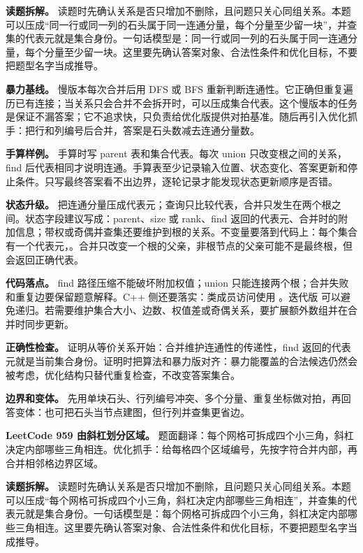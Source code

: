 \textbf{读题拆解。} 读题时先确认关系是否只增加不删除，且问题只关心同组关系。本题可以压成“同一行或同一列的石头属于同一连通分量，每个分量至少留一块”，并查集的代表元就是集合身份。一句话模型是：同一行或同一列的石头属于同一连通分量，每个分量至少留一块。这里要先确认答案对象、合法性条件和优化目标，不要把题型名字当成推导。

\textbf{暴力基线。} 慢版本每次合并后用 DFS 或 BFS 重新判断连通性。它正确但重复遍历已有连接；当关系只会合并不会拆开时，可以压成集合代表。这个慢版本的任务是保证不漏答案；它不追求快，只负责给优化版提供对拍基准。随后再引入优化抓手：把行和列编号后合并，答案是石头数减去连通分量数。

\textbf{手算样例。} 手算时写 parent 表和集合代表。每次 union 只改变根之间的关系，find 后代表相同才说明连通。手算表至少记录输入位置、状态变化、答案更新和停止条件。只写最终答案看不出边界，逐轮记录才能发现状态更新顺序是否错。

\textbf{状态升级。} 把连通分量压成代表元；查询只比较代表，合并只发生在两个根之间。状态字段建议写成：parent、size 或 rank、find 返回的代表元、合并时的附加信息；带权或奇偶并查集还要维护到根的关系。不变量要落到代码上：每个集合有一个代表元，。合并只改变一个根的父亲，非根节点的父亲可能不是最终根，但  会返回正确代表。

\textbf{代码落点。} find 路径压缩不能破坏附加权值；union 只能连接两个根；合并失败和重复边要保留题意解释。C++ 侧还要落实：类成员访问使用 。迭代版  可以避免递归。若需要维护集合大小、边数、权值差或奇偶关系，要扩展额外数组并在合并时同步更新。

\textbf{正确性检查。} 证明从等价关系开始：合并维护连通性的传递性，find 返回的代表元就是当前集合身份。证明时把算法和暴力版对齐：暴力能覆盖的合法候选仍然会被考虑，优化结构只替代重复检查，不改变答案集合。

\textbf{边界和变体。} 先用单块石头、行列编号冲突、多个分量、重复坐标做对拍，再回答变体：也可把石头当节点建图，但行列并查集更省边。

\noindent\textbf{LeetCode 959 由斜杠划分区域。} 题面翻译：每个网格可拆成四个小三角，斜杠决定内部哪些三角相连。优化抓手：给每格四个区域编号，先按字符合并内部，再合并相邻格边界区域。

\textbf{读题拆解。} 读题时先确认关系是否只增加不删除，且问题只关心同组关系。本题可以压成“每个网格可拆成四个小三角，斜杠决定内部哪些三角相连”，并查集的代表元就是集合身份。一句话模型是：每个网格可拆成四个小三角，斜杠决定内部哪些三角相连。这里要先确认答案对象、合法性条件和优化目标，不要把题型名字当成推导。

